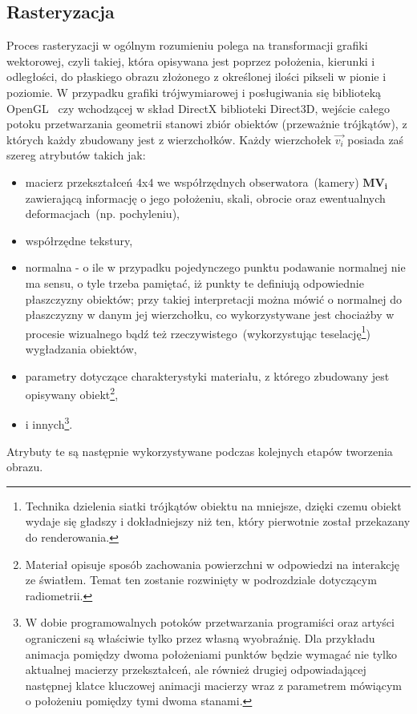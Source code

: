 \subsection{Rasteryzacja}
Proces rasteryzacji w ogólnym rozumieniu polega na transformacji grafiki wektorowej, czyli takiej, która opisywana jest poprzez położenia, kierunki i odległości, do płaskiego obrazu złożonego z określonej ilości pikseli w pionie i poziomie. W przypadku grafiki trójwymiarowej i posługiwania się biblioteką OpenGL~\cite{OPENGL46} czy wchodzącej w skład DirectX biblioteki Direct3D, wejście całego potoku przetwarzania geometrii stanowi zbiór obiektów (przeważnie trójkątów), z których każdy zbudowany jest z wierzchołków. Każdy wierzchołek $\vec{v_i}$ posiada zaś szereg atrybutów takich jak:
\begin{itemize}
\item macierz przekształceń 4x4 we współrzędnych obserwatora~(kamery) $\mathbf{MV_i}$ zawierającą informację o jego położeniu, skali, obrocie oraz ewentualnych deformacjach~(np. pochyleniu),
\item współrzędne tekstury,
\item normalna - o ile w przypadku pojedynczego punktu podawanie normalnej nie ma sensu, o tyle trzeba pamiętać, iż punkty te definiują odpowiednie płaszczyzny obiektów; przy takiej interpretacji można mówić o normalnej do płaszczyzny w danym jej wierzchołku, co wykorzystywane jest chociażby w procesie wizualnego bądź też rzeczywistego~(wykorzystując teselację\footnote{Technika dzielenia siatki trójkątów obiektu na mniejsze, dzięki czemu obiekt wydaje się gładszy i dokładniejszy niż ten, który pierwotnie został przekazany do renderowania.}) wygładzania obiektów,
\item parametry dotyczące charakterystyki materiału, z którego zbudowany jest opisywany obiekt\footnote{Materiał opisuje sposób zachowania powierzchni w odpowiedzi na interakcję ze światłem. Temat ten zostanie rozwinięty w podrozdziale dotyczącym radiometrii. },
\item i innych\footnote{W dobie programowalnych potoków przetwarzania programiści oraz artyści ograniczeni są właściwie tylko przez własną wyobraźnię. Dla przykładu animacja pomiędzy dwoma położeniami punktów będzie wymagać nie tylko aktualnej macierzy przekształceń, ale również drugiej odpowiadającej następnej klatce kluczowej animacji macierzy wraz z parametrem mówiącym o położeniu pomiędzy tymi dwoma stanami.}.
\end{itemize}
Atrybuty te są następnie wykorzystywane podczas kolejnych etapów tworzenia obrazu.


